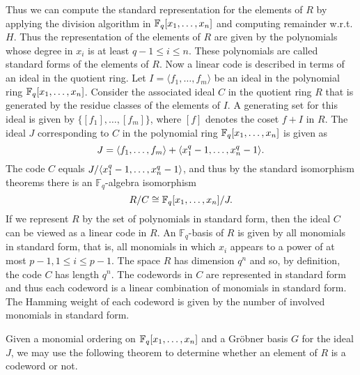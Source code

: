 \documentclass[english,bachelor]{liumaiex}
\begin{document}
Thus we can compute the standard representation for the elements of $R$ by applying the division algorithm in $\mathbb{F}_q[x_1,\dots,x_n]$ and computing remainder w.r.t. $H$. Thus the representation of the elements of $R$ are given by the polynomials whose degree in $x_i$ is at least $q-1\leq i\leq n$. These polynomials are called standard forms of the elements of $R$. Now a linear code is described in terms of an ideal in the quotient ring. Let $I=\langle f_1,\dots,f_m\rangle$ be an ideal in the polynomial ring $\mathbb{F}_q[x_1,\dots,x_n]$. Consider the associated ideal $C$ in the quotient ring $R$ that is generated by the residue classes of the elements of $I$. A generating set for this ideal is given by $\{[f_1],\dots,[f_m]\}$, where $[f]$ denotes the coset $f+I$ in $R$. The ideal $J$ corresponding to $C$ in the polynomial ring $\mathbb{F}_q[x_1,\dots,x_n]$ is given as
\begin{displaymath}
J=\langle f_1,\dots,f_m\rangle +\langle x_1^q-1,\dots,x_n^q-1\rangle.
\end{displaymath}
The code $C$ equals $J/\langle x_1^q-1,\dots,x_n^q-1\rangle$, and thus by the standard isomorphism theorems there is an $\mathbb{F}_q$-algebra isomorphism
\begin{displaymath}
R/C\cong\mathbb{F}_q[x_1,\dots,x_n]/J.
\end{displaymath}
If we represent $R$ by the set of polynomials in standard form, then the ideal $C$ can be viewed as a linear code in $R$. An $\mathbb{F}_q$-basis of $R$ is given by all monomials in standard form, that is, all monomials in which $x_i$ appears to a power of at most $p-1, 1\leq i\leq p-1$. The space $R$ has dimension $q^n$ and so, by definition, the code $C$ has length $q^n$. The codewords in $C$ are represented in standard form and thus each codeword is a linear combination of monomials in standard form. The Hamming weight of each codeword is given by the number of involved monomials in standard form.

Given a monomial ordering on $\mathbb{F}_q[x_1,\dots,x_n]$ and a Gröbner basis $G$ for the ideal $J$, we may use the following theorem to determine whether an element of $R$ is a codeword or not.
\end{document}
